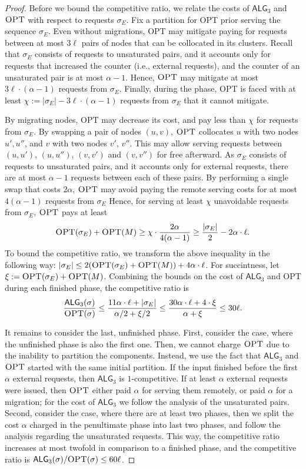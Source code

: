 \documentclass[a4paper,anonymous,USenglish]{lipics-v2019}
\newcommand{\OPT}{\textsc{OPT}\xspace}
\newcommand{\TAlg}{{\ensuremath{\textsf{ALG}_{3}}}\xspace}
\begin{document}
\begin{proof}
	\medskip
	Before we bound the competitive ratio, we relate the costs of $\TAlg$ and $\OPT$ with respect to requests $\sigma_E$.
	Fix a partition for \OPT prior serving the sequence $\sigma_E$.
	Even without migrations, \OPT may mitigate paying for requests between at most $3\ell$ pairs of nodes that can be collocated in its clusters.
	Recall that $\sigma_E$ consists of requests to unsaturated pairs, and it accounts only for requests that increased the counter (i.e., external requests), and the counter of an unsaturated pair is at most $\alpha - 1$.
	Hence, $\OPT$ may mitigate at most $3\ell\cdot(\alpha - 1)$ requests from $\sigma_E$.
	Finally, during the phase, \OPT is faced with at least $\chi := |\sigma_E| - 3\ell\cdot(\alpha-1)$ requests from $\sigma_E$ that it cannot mitigate.

	By migrating nodes, \OPT may decrease its cost, and pay less than $\chi$ for requests from $\sigma_E$.
	By swapping a pair of nodes $(u,v)$, $\OPT$ collocates $u$ with two nodes $u', u''$, and $v$ with two nodes $v'$, $v''$.
	This may allow serving requests between $(u,u')$, $(u,u'')$, $(v,v')$ and $(v,v'')$ for free afterward.
	As $\sigma_E$ consists of requests to unsaturated pairs, and it accounts only for external requests, there are at most $\alpha-1$ requests between each of these pairs.
	By performing a single swap that costs $2\alpha$, $\OPT$ may avoid paying the remote serving costs for at most $4 (\alpha - 1)$ requests from $\sigma_E$
	Hence, for serving at least $\chi$ unavoidable requests from $\sigma_E$, $\OPT$ pays at least
	\[
		\OPT(\sigma_E) + \OPT(M) \geq \chi \cdot \frac{2\alpha}{4 (\alpha-1)}\geq \frac{|\sigma_E|} {2} - 2 \alpha \cdot \ell.
	\]
	To bound the competitive ratio, we transform the above inequality in the following way: $|\sigma_E| \leq 2(\OPT(\sigma_E)+\OPT(M)) + 4\alpha \cdot \ell$.
	For succintness, let $\xi := \OPT(\sigma_E) + \OPT(M)$.
	Combining the bounds on the cost of \TAlg and \OPT during each finished phase, the competitive ratio is
%
	\[
		\frac{\TAlg(\sigma)}{\OPT(\sigma)} \leq \frac{11\alpha \cdot \ell + |\sigma_E|}{\alpha/2 + \xi/2} \leq \frac{30\alpha\cdot\ell + 4\cdot \xi}{\alpha + \xi} \leq 30 \ell.
	\]
%	
	\medskip
	
	It remains to consider the last, unfinished phase.
	First, consider the case, where the unfinished phase is also the first one.
	Then, we cannot charge $\OPT$ due to the inability to partition the components.
	Instead, we use the fact that \TAlg and $\OPT$ started with the same initial partition.
	If the input finished before the first $\alpha$ external requests, then \TAlg is $1$-competitive.
	If at least $\alpha$ external requests were issued, then $\OPT$ either paid $\alpha$ for serving them remotely, or paid $\alpha$ for a migration; for the cost of \TAlg we follow the analysis of the unsaturated pairs.
	Second, consider the case, where there are at least two phases, then we split the cost $\alpha$ charged in the penultimate phase into last two phases, and follow the analysis regarding the unsaturated requests.
	This way, the competitive ratio increases at most twofold in comparison to a finished phase, and the competitive ratio is $\TAlg(\sigma)/\OPT(\sigma) \leq 60\ell$.
\end{proof}
\end{document}
